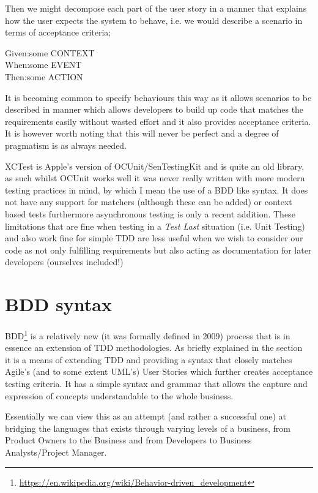 \documentclass[a4paper, titlepage]{article}
\begin{document}
  Then we might decompose each part of the user story in a
  manner that explains how the user expects the system to behave, i.e. we
  would describe a scenario in terms of acceptance criteria;

  \begin{spec}{0.5}
    \ac{Given:}{some CONTEXT}\\
    \ac{When:}{some EVENT}\\
    \ac{Then:}{some ACTION}
  \end{spec}

  It is becoming common to specify behaviours this way as it allows
  scenarios to be described in manner which allows developers to build
  up code that matches the requirements easily without wasted effort and
  it also provides acceptance criteria. It is however worth noting that
  this will never be perfect and a degree of pragmatism is as always
  needed.
  
  XCTest is Apple's version of OCUnit/SenTestingKit and is quite an
  old library,
  as such whilst OCUnit works well it was never really written with more
  modern testing practices in mind, by which I mean the use of a BDD like syntax. It does
  not have any support for matchers (although these can be added) or context based tests furthermore
  asynchronous testing is only a recent addition. These 
  limitations that are fine when testing in a \textit{Test Last}
  situation (i.e. Unit Testing) and also work fine for simple
  TDD are less useful when we wish to consider our code as not only
  fulfilling requirements but also acting as documentation for later
  developers (ourselves included!)\\

\section{BDD syntax}
  BDD\footnote{\url{https://en.wikipedia.org/wiki/Behavior-driven_development}}
  is a relatively new (it was formally defined in 2009) process that is in
  essence an extension of TDD methodologies. As briefly explained in the
  section~ it is a means of extending TDD and
  providing a syntax that closely matches Agile's (and to some extent UML's) User
  Stories which further creates acceptance testing criteria. 
  It has a simple syntax and
  grammar that allows the capture and expression of concepts
  understandable to the whole business.

  Essentially we can view this as an attempt (and rather a successful
  one) at bridging the languages that exists through varying levels of
  a business, from Product Owners to the Business and from Developers to
  Business Analysts/Project Manager. 
  
\end{document}
